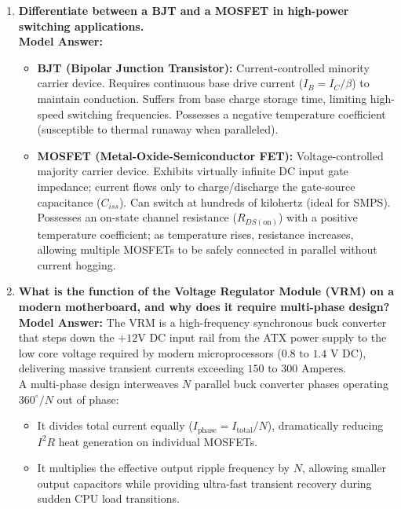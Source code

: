 \begin{enumerate}[leftmargin=*,label=\textbf{Q\arabic*.}]
    \item \textbf{Differentiate between a BJT and a MOSFET in high-power switching applications.} \\
    \textbf{Model Answer:}
    \begin{itemize}
        \item \textbf{BJT (Bipolar Junction Transistor):} Current-controlled minority carrier device. Requires continuous base drive current ($I_B = I_C / \beta$) to maintain conduction. Suffers from base charge storage time, limiting high-speed switching frequencies. Possesses a negative temperature coefficient (susceptible to thermal runaway when paralleled).
        \item \textbf{MOSFET (Metal-Oxide-Semiconductor FET):} Voltage-controlled majority carrier device. Exhibits virtually infinite DC input gate impedance; current flows only to charge/discharge the gate-source capacitance ($C_{iss}$). Can switch at hundreds of kilohertz (ideal for SMPS). Possesses an on-state channel resistance ($R_{DS(\text{on})}$) with a positive temperature coefficient; as temperature rises, resistance increases, allowing multiple MOSFETs to be safely connected in parallel without current hogging.
    \end{itemize}

    \item \textbf{What is the function of the Voltage Regulator Module (VRM) on a modern motherboard, and why does it require multi-phase design?} \\
    \textbf{Model Answer:} The VRM is a high-frequency synchronous buck converter that steps down the $+12\text{V DC}$ input rail from the ATX power supply to the low core voltage required by modern microprocessors ($0.8\text{ to }1.4\text{ V DC}$), delivering massive transient currents exceeding $150\text{ to }300\text{ Amperes}$. \\
    A multi-phase design interweaves $N$ parallel buck converter phases operating $360^\circ / N$ out of phase:
    \begin{itemize}
        \item It divides total current equally ($I_{\text{phase}} = I_{\text{total}} / N$), dramatically reducing $I^2 R$ heat generation on individual MOSFETs.
        \item It multiplies the effective output ripple frequency by $N$, allowing smaller output capacitors while providing ultra-fast transient recovery during sudden CPU load transitions.
    \end{itemize}


\end{enumerate}
